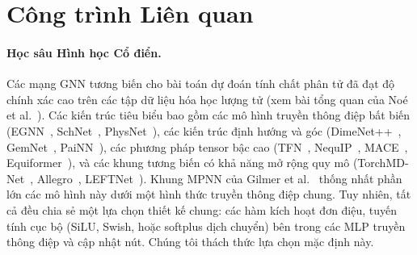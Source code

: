 \documentclass[10pt,twocolumn,letterpaper]{article}
\begin{document}
\section{Công trình Liên quan}
\label{sec:related}

\paragraph{Học sâu Hình học Cổ điển.}
Các mạng GNN tương biến cho bài toán dự đoán tính chất phân tử đã đạt độ chính xác cao trên các tập dữ liệu hóa học lượng tử (xem bài tổng quan của No{\'e} et al.~\cite{Noe:2019yup}). Các kiến trúc tiêu biểu bao gồm các mô hình truyền thông điệp bất biến (EGNN~\cite{satorras2022enequivariantgraphneural}, SchNet~\cite{schütt2017schnetcontinuousfilterconvolutionalneural}, PhysNet~\cite{unkePhysNetNeuralNetwork2019}), các kiến trúc định hướng và góc (DimeNet++~\cite{klicperaFastUncertaintyAwareDirectional2020}, GemNet~\cite{klicperaGemNetUniversalDirectional2021}, PaiNN~\cite{schuttEquivariantMessagePassing2021}), các phương pháp tensor bậc cao (TFN~\cite{thomasTensorFieldNetworks2018}, NequIP~\cite{batznerE3equivariantGraphNeural2021}, MACE~\cite{batatiaMACEHigherOrder2022}, Equiformer~\cite{liao2023equiformer}), và các khung tương biến có khả năng mở rộng quy mô (TorchMD-Net~\cite{tholke2022torchmdnet}, Allegro~\cite{musaelianLearningLocalEquivariant2022}, LEFTNet~\cite{duNewPerspectiveBuilding2023}). Khung MPNN của Gilmer et al.~\cite{gilmer2017neural} thống nhất phần lớn các mô hình này dưới một hình thức truyền thông điệp chung. Tuy nhiên, tất cả đều chia sẻ một lựa chọn thiết kế chung: các hàm kích hoạt đơn điệu, tuyến tính cục bộ (SiLU, Swish, hoặc softplus dịch chuyển) bên trong các MLP truyền thông điệp và cập nhật nút. Chúng tôi thách thức lựa chọn mặc định này.
\end{document}
